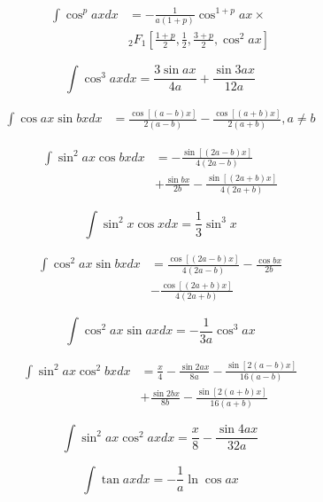 \documentclass[11pt,twoside]{article}
\begin{document}
\begin{multicols}{3}
\begin{footnotesize}
\begin{align}
\int \cos^p ax dx & = -\frac{1}{a(1+p)}{\cos^{1+p} ax} \times 
\nonumber \\ &
{_2F_1}\left[
\frac{1+p}{2}, \frac{1}{2}, \frac{3+p}{2}, \cos^2 ax
\right] 
\end{align}

\begin{equation}
\int \cos^3 ax dx = \frac{3 \sin ax}{4a}+\frac{ \sin 3ax}{12a} 
\end{equation}

\begin{align}
\int \cos ax \sin bx dx &= \frac{\cos[(a-b) x]}{2(a-b)} -
 \frac{\cos[(a+b)x]}{2(a+b)} , a\ne b
\end{align}

\begin{align}
\int \sin^2 ax \cos bx dx &= 
-\frac{\sin[(2a-b)x]}{4(2a-b)} \nonumber \\ & 
+ \frac{\sin bx}{2b} 
- \frac{\sin[(2a+b)x]}{4(2a+b)}
\end{align}

\begin{equation}
\int \sin^2 x \cos x dx = \frac{1}{3} \sin^3 x
\end{equation}

\begin{align}
\int \cos^2 ax \sin bx dx &= \frac{\cos[(2a-b)x]}{4(2a-b)} 
- \frac{\cos bx}{2b}
\nonumber \\ &
 - \frac{\cos[(2a+b)x]}{4(2a+b)}
\end{align}

\begin{equation}
\int \cos^2 ax \sin ax dx = -\frac{1}{3a}\cos^3{ax} 
\end{equation}

\begin{align}
\int \sin^2 ax \cos^2 bx dx &= \frac{x}{4}
-\frac{\sin 2ax}{8a}-
\frac{\sin[2(a-b)x]}{16(a-b)}
\nonumber \\ &
+\frac{\sin 2bx}{8b}-
\frac{\sin[2(a+b)x]}{16(a+b)}
\end{align}

\begin{equation}
\int \sin^2 ax \cos^2 ax dx = \frac{x}{8}-\frac{\sin 4ax}{32a}
\end{equation}

\begin{equation}
\int \tan ax dx = -\frac{1}{a} \ln \cos ax 
\end{equation}


\end{footnotesize}
\end{multicols}
\end{document}
